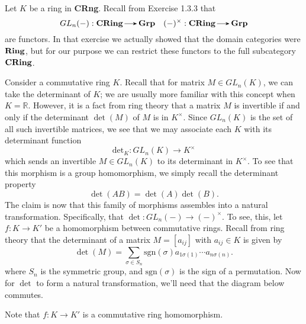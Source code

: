     \begin{example}
        Let $K$ be a ring in \textbf{CRng}.
        Recall from Exercise 1.3.3 that 
        \[
            GL_n(-): \cring \to \grp
            \quad
            (-)^{\times}: \cring \to \grp  
        \]
        are functors. In that exercise we actually showed that the domain categories 
        were $\operatorname{\mathbf{Ring}}$, but for our purpose we can restrict these functors to 
        the full subcategory $\operatorname{\mathbf{CRing}}$.

        Consider a commutative ring $K$. Recall that for matrix $M \in GL_n(K)$, 
        we can take the determinant of $K$; we are usually more familiar with this concept 
        when $K = \mathbb{R}$. However, it is a fact from ring theory 
        that a matrix $M$ is invertible if and only if the determinant $\det(M)$ of $M$ is in 
        $K^{\times}$. Since $GL_n(K)$ is the set of all such invertible matrices, 
        we see that we may associate each $K$ with its determinant function
        \[
            \text{det}_K: GL_n(K) \to K^{\times}
        \]
        which sends an invertible $M\in GL_n(K)$ to its determinant in $K^{\times}$. 
        To see that this morphism is a group homomorphism, we simply recall the determinant property 
        \[
            \det(AB) = \det(A)\det(B).
        \] 
        The claim is now that this family of morphisms assembles into a natural transformation. 
        Specifically, that $\det: GL_n(-) \to (-)^{\times}$.
        To see, this, let $f: K \to K'$ be a homomorphism between commutative rings. 
        Recall from ring theory that the determinant of a matrix $M = [a_{ij}]$ with $a_{ij} \in K$ 
        is given by 
        \[
            \det(M) = \sum_{\sigma \in S_n}\text{sgn}(\sigma)a_{1\sigma(1)}\cdots a_{n\sigma(n)}.
        \]
        where $S_n$ is the symmetric group, and $\text{sgn}(\sigma)$ is the sign 
        of a permutation.
        Now for $\det$ to form a natural transformation, we'll need that the diagram below commutes.
        \begin{center}
        \end{center}
        Note that $f: K \to K'$ is a commutative ring homomorphism.

\end{example}
